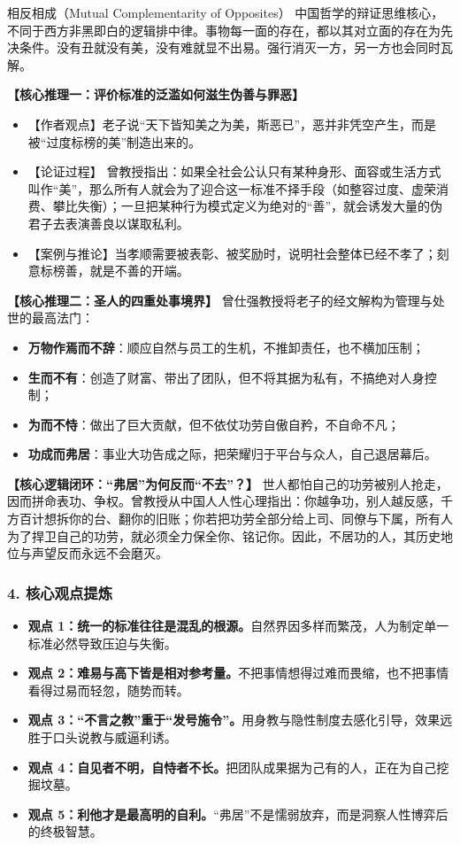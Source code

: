 \begin{ConceptBox}{相反相成（Mutual Complementarity of Opposites）}
中国哲学的辩证思维核心，不同于西方非黑即白的逻辑排中律。事物每一面的存在，都以其对立面的存在为先决条件。没有丑就没有美，没有难就显不出易。强行消灭一方，另一方也会同时瓦解。
\end{ConceptBox}

\noindent\textbf{【核心推理一：评价标准的泛滥如何滋生伪善与罪恶】}
\begin{itemize}
    \item 【作者观点】老子说“天下皆知美之为美，斯恶已”，恶并非凭空产生，而是被“过度标榜的美”制造出来的。
    \item 【论证过程】
    曾教授指出：如果全社会公认只有某种身形、面容或生活方式叫作“美”，那么所有人就会为了迎合这一标准不择手段（如整容过度、虚荣消费、攀比失衡）；一旦把某种行为模式定义为绝对的“善”，就会诱发大量的伪君子去表演善良以谋取私利。
    \item 【案例与推论】当孝顺需要被表彰、被奖励时，说明社会整体已经不孝了；刻意标榜善，就是不善的开端。
\end{itemize}

\noindent\textbf{【核心推理二：圣人的四重处事境界】}
曾仕强教授将老子的经文解构为管理与处世的最高法门：
\begin{itemize}
    \item \textbf{万物作焉而不辞}：顺应自然与员工的生机，不推卸责任，也不横加压制；
    \item \textbf{生而不有}：创造了财富、带出了团队，但不将其据为私有，不搞绝对人身控制；
    \item \textbf{为而不恃}：做出了巨大贡献，但不依仗功劳自傲自矜，不自命不凡；
    \item \textbf{功成而弗居}：事业大功告成之际，把荣耀归于平台与众人，自己退居幕后。
\end{itemize}

\noindent\textbf{【核心逻辑闭环：“弗居”为何反而“不去”？】}
世人都怕自己的功劳被别人抢走，因而拼命表功、争权。曾教授从中国人人性心理指出：你越争功，别人越反感，千方百计想拆你的台、翻你的旧账；你若把功劳全部分给上司、同僚与下属，所有人为了捍卫自己的功劳，就必须全力保全你、铭记你。因此，不居功的人，其历史地位与声望反而永远不会磨灭。

\subsubsection{4. 核心观点提炼}
\begin{itemize}
    \item \textbf{观点 1：统一的标准往往是混乱的根源。}自然界因多样而繁茂，人为制定单一标准必然导致压迫与失衡。
    \item \textbf{观点 2：难易与高下皆是相对参考量。}不把事情想得过难而畏缩，也不把事情看得过易而轻忽，随势而转。
    \item \textbf{观点 3：“不言之教”重于“发号施令”。}用身教与隐性制度去感化引导，效果远胜于口头说教与威逼利诱。
    \item \textbf{观点 4：自见者不明，自恃者不长。}把团队成果据为己有的人，正在为自己挖掘坟墓。
    \item \textbf{观点 5：利他才是最高明的自利。}“弗居”不是懦弱放弃，而是洞察人性博弈后的终极智慧。
\end{itemize}

